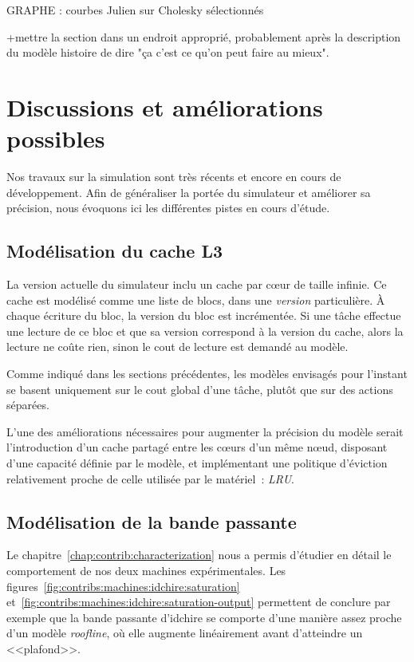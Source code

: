 \begin{todo}
GRAPHE : courbes Julien sur Cholesky sélectionnés

+mettre la section dans un endroit approprié, probablement après la description du modèle histoire de dire "ça c'est ce qu'on peut faire au mieux".
\end{todo}

\section{Discussions et améliorations possibles}\label{sec:simulation:next}

Nos travaux sur la simulation sont très récents et encore en cours de développement.
Afin de généraliser la portée du simulateur et améliorer sa précision, nous évoquons ici les différentes pistes en cours d'étude.

\subsection{Modélisation du cache L3}

La version actuelle du simulateur inclu un cache par cœur de taille infinie.
Ce cache est modélisé comme une liste de blocs, dans une \emph{version} particulière.
À chaque écriture du bloc, la version du bloc est incrémentée.
Si une tâche effectue une lecture de ce bloc et que sa version correspond à la version du cache, alors la lecture ne coûte rien, sinon le cout de lecture est demandé au modèle.

Comme indiqué dans les sections précédentes, les modèles envisagés pour l'instant se basent uniquement sur le cout global d'une tâche, plutôt que sur des actions séparées.

L'une des améliorations nécessaires pour augmenter la précision du modèle serait l'introduction d'un cache partagé entre les cœurs d'un même nœud, disposant d'une capacité définie par le modèle, et implémentant une politique d'éviction relativement proche de celle utilisée par le matériel~: \emph{LRU}.

\subsection{Modélisation de la bande passante}

Le chapitre~\ref{chap:contrib:characterization} nous a permis d'étudier en détail le comportement de nos deux machines expérimentales.
Les figures~\ref{fig:contribs:machines:idchire:saturation} et~\ref{fig:contribs:machines:idchire:saturation-output} permettent de conclure par exemple que la bande passante d'idchire se comporte d'une manière assez proche d'un modèle \emph{roofline}, où elle augmente linéairement avant d'atteindre un <<plafond>>.

